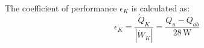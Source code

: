 The coefficient of performance \( \epsilon_K \) is calculated as:  
\[
\epsilon_K = \frac{\dot{Q}_K}{|\dot{W}_K|} = \frac{Q_u - Q_{ab}}{28 \, \text{W}}
\]